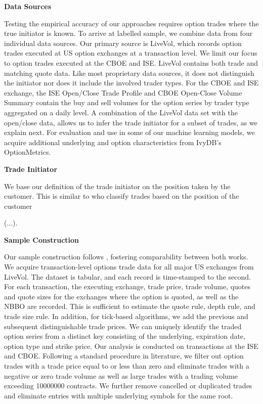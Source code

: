 \textbf{Data Sources}
 
Testing the empirical accuracy of our approaches requires option trades where the true initiator is known. To arrive at labelled sample, we combine data from four individual data sources. Our primary source is LiveVol, which records option trades executed at US option exchanges at a transaction level. We limit our focus to option trades executed at the \gls{CBOE} and \gls{ISE}. LiveVol contains both trade and matching quote data. Like most proprietary data sources, it does not distinguish the initiator nor does it include the involved trader types. For the \gls{CBOE} and \gls{ISE} exchange, the \gls{ISE} Open/Close Trade Profile and \gls{CBOE} Open-Close Volume Summary contain the buy and sell volumes for the option series by trader type aggregated on a daily level. A combination of the LiveVol data set with the open/close data, allows us to infer the trade initiator for a subset of trades, as we explain next. For evaluation and use in some of our machine learning models, we acquire additional underlying and option characteristics from IvyDB's OptionMetrics.

\textbf{Trade Initiator}

We base our definition of the trade initiator on the position taken by the customer. This is similar to \textcite[][533]{ellisAccuracyTradeClassification2000} who classify trades based on the position of the customer 

(...).

\textbf{Sample Construction}

Our sample construction follows \textcite[][7--9]{grauerOptionTradeClassification2022}, fostering comparability between both works. We acquire transaction-level options trade data for all major US exchanges from LiveVol. The dataset is tabular, and each record is time-stamped to the second. For each transaction, the executing exchange, trade price, trade volume, quotes and quote sizes for the exchanges where the option is quoted, as well as the \gls{NBBO} are recorded. This is sufficient to estimate the quote rule, depth rule, and trade size rule. In addition, for tick-based algorithms, we add the previous and subsequent distinguishable trade prices. We can uniquely identify the traded option series from a distinct key consisting of the underlying, expiration date, option type and strike price. Our analysis is conducted on transactions at the \gls{ISE} and \gls{CBOE}. Following a standard procedure in literature, we filter out option trades with a trade price equal to or less than zero and eliminate trades with a negative or zero trade volume as well as large trades with a trading volume exceeding \num{10000000} contracts. We further remove cancelled or duplicated trades and eliminate entries with multiple underlying symbols for the same root.

